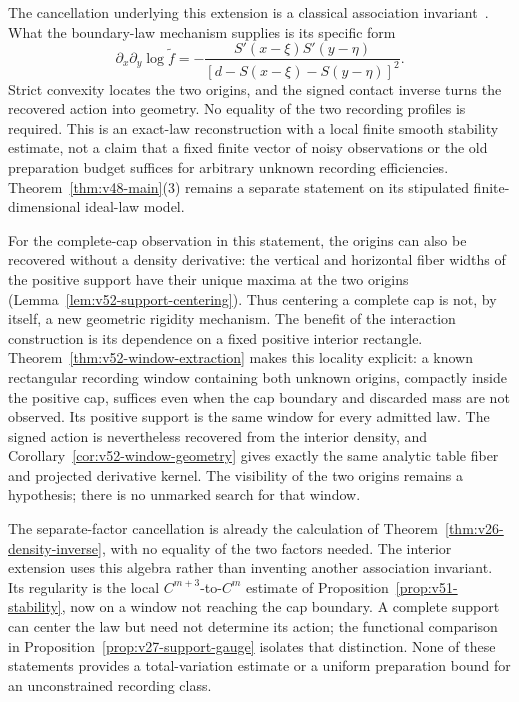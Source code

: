 The cancellation underlying this extension is a classical association
invariant~\cite{HollandWang1987,Osius2009}.  What the boundary-law mechanism
supplies is its specific form
\[
 \partial_x\partial_y\log\widetilde f
 =-\frac{S'(x-\xi)S'(y-\eta)}
           {[d-S(x-\xi)-S(y-\eta)]^2}.
\]
Strict convexity locates the two origins, and the signed contact inverse
turns the recovered action into geometry.  No equality of the two recording
profiles is required.  This is an exact-law reconstruction with a local
finite smooth stability estimate, not a claim that a fixed finite vector
of noisy observations or the old preparation budget suffices for arbitrary
unknown recording efficiencies.  Theorem~\ref{thm:v48-main}(3) remains a
separate statement on its stipulated finite-dimensional ideal-law model.


For the complete-cap observation in this statement, the origins can also
be recovered without a density derivative: the vertical and horizontal
fiber widths of the positive support have their unique maxima at the two
origins (Lemma~\ref{lem:v52-support-centering}).  Thus centering a complete
cap is not, by itself, a new geometric rigidity mechanism.  The benefit
of the interaction construction is its dependence on a fixed positive
interior rectangle.  Theorem~\ref{thm:v52-window-extraction} makes this
locality explicit: a known rectangular recording window containing both
unknown origins, compactly inside the positive cap, suffices even when
the cap boundary and discarded mass are not observed.  Its positive
support is the same window for every admitted law.  The signed action
is nevertheless recovered from the interior density, and
Corollary~\ref{cor:v52-window-geometry} gives exactly the same analytic
table fiber and projected derivative kernel.  The visibility of the two
origins remains a hypothesis; there is no unmarked search for that window.

The separate-factor cancellation is already the calculation of
Theorem~\ref{thm:v26-density-inverse}, with no equality of the two factors
needed.  The interior extension uses this algebra rather than inventing
another association invariant.  Its regularity is the local
$C^{m+3}$-to-$C^m$ estimate of Proposition~\ref{prop:v51-stability},
now on a window not reaching the cap boundary.  A complete support can
center the law but need not determine its action; the functional
comparison in Proposition~\ref{prop:v27-support-gauge} isolates that
distinction.  None of these statements provides a total-variation
estimate or a uniform preparation bound for an unconstrained recording
class.
